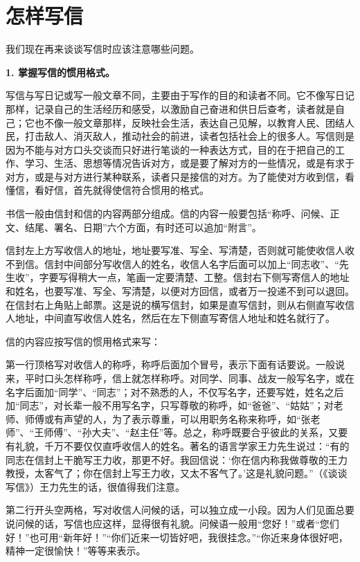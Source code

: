 \section{怎样写信}

我们现在再来谈谈写信时应该注意哪些问题。

\textbf{1. 掌握写信的惯用格式。}

写信与写日记或写一般文章不同，主要由于写作的目的和读者不同。它不像写日记那样，记录自己的生活经历和感受，以激励自己奋进和供日后查考，读者就是自己；它也不像一般文章那样，反映社会生活，表达自己见解，以教育人民、团结人民，打击敌人、消灭敌人，推动社会的前进，读者包括社会上的很多人。写信则是因为不能与对方口头交谈而只好进行笔谈的一种表达方式，目的在于把自己的工作、学习、生活、思想等情况告诉对方，或是要了解对方的一些情况，或是有求于对方，或是与对方进行某种联系，读者只是接信的对方。为了能使对方收到信，看懂信，看好信，首先就得使信符合惯用的格式。

书信一般由信封和信的内容两部分组成。信的内容一般要包括“称呼、问候、正文、结尾、署名、日期”六个方面，有时还可以追加“附言”。

信封左上方写收信人的地址，地址要写准、写全、写清楚，否则就可能使收信人收不到信。信封中间部分写收信人的姓名，收信人名字后面可以加上“同志收”、“先生收”，字要写得稍大一点，笔画一定要清楚、工整。信封右下侧写寄信人的地址和姓名，也要写准、写全、写清楚，以便对方回信，或者万一投递不到可以退回。在信封右上角贴上邮票。这是说的横写信封，如果是直写信封，则从右侧直写收信人地址，中间直写收信人姓名，然后在左下侧直写寄信人地址和姓名就行了。

信的内容应按写信的惯用格式来写：

第一行顶格写对收信人的称呼，称呼后面加个冒号，表示下面有话要说。一般说来，平时口头怎样称呼，信上就怎样称呼。对同学、同事、战友一般写名字，或在名字后面加“同学”、“同志”；对不熟悉的人，不仅写名字，还要写姓，姓名之后加“同志”，对长辈一般不用写名字，只写尊敬的称呼，如“爸爸”、“姑姑”；对老师、师傅或有声望的人，为了表示尊重，可以用职务名称来称呼，如“张老师”、“王师傅”、“孙大夫”、“赵主任”等。总之，称呼既要合乎彼此的关系，又要有礼貌，千万不要仅仅直呼收信人的姓名。著名的语言学家王力先生说过：“有的同志在信封上干脆写王力收，那更不好。我回信说：‘你在信内称我做尊敬的王力教授，太客气了；你在信封上写王力收，又太不客气了。’这是礼貌问题。”（《谈谈写信》）王力先生的话，很值得我们注意。

第二行开头空两格，写对收信人问候的话，可以独立成一小段。因为人们见面总要说问候的话，写信也应这样，显得很有礼貌。问候语一般用“您好！”或者“您们好！”也可用“新年好！”“你们近来一切皆好吧，我很挂念。”“你近来身体很好吧，精神一定很愉快！”等等来表示。

